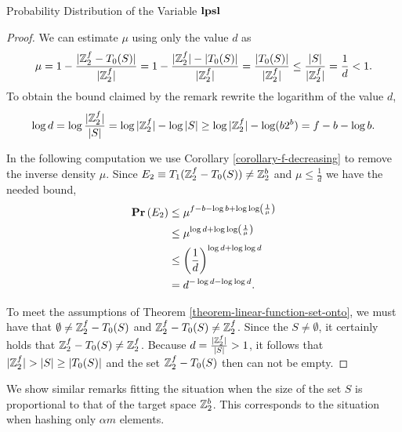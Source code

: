 \begin{section}{Probability Distribution of the Variable \texorpdfstring{$\mathbf{lpsl}$}{lpsl}}
\begin{proof}
We can estimate $\mu$ using only the value $d$ as
\[
	\mu = 1 - \frac{|\mathbb{Z}_{2}^{f} - T_0(S)|}{|\mathbb{Z}_{2}^{f}|} = 1 - \frac{|\mathbb{Z}_{2}^{f}| - |T_0(S)|}{|\mathbb{Z}_{2}^{f}|} = \frac{|T_0(S)|}{|\mathbb{Z}_{2}^{f}|} \leq \frac{|S|}{|\mathbb{Z}_{2}^{f}|} = \frac{1}{d} < 1 \text{.}
\]
To obtain the bound claimed by the remark rewrite the logarithm of the value $d$,
\[
	\log d = \log \frac{|\mathbb{Z}_{2}^{f}|}{|S|} = \log |\mathbb{Z}_{2}^{f}| - \log |S| \geq \log |\mathbb{Z}_{2}^{f}| - \log (b 2 ^ b) = f - b - \log b \text{.}
\]

In the following computation we use Corollary \ref{corollary-f-decreasing} to remove the inverse density $\mu$. Since $E_2 \equiv T_1(\mathbb{Z}_{2}^{f} - T_0(S)) \neq \mathbb{Z}_{2}^{b}$ and $\mu \leq \frac{1}{d}$ we have the needed bound,
\[
\begin{split}
\mathbf{Pr}\left(E_2\right)
	& \leq \mu^{f - b - \log b + \log \log \left(\frac{1}{\mu}\right)} \\
	& \leq \mu ^ {\log d + \log \log \left(\frac{1}{\mu}\right)} \\
	& \leq \left(\frac{1}{d}\right) ^ {\log d + \log \log d} \\
	& = d ^ {-\log d - \log \log d} \text{.} \\
\end{split}
\]

To meet the assumptions of Theorem \ref{theorem-linear-function-set-onto}, we must have that $\emptyset \neq \mathbb{Z}_{2}^{f} - T_0(S)$ and $\mathbb{Z}_{2}^{f} - T_0(S) \neq \mathbb{Z}_{2}^{f}$. Since the $S \neq \emptyset$, it certainly holds that $\mathbb{Z}_{2}^{f} - T_0(S) \neq \mathbb{Z}_{2}^{f}$. Because $d = \frac{|\mathbb{Z}_{2}^{f}|}{|S|} > 1$, it follows that $|\mathbb{Z}_{2}^{f}| > |S| \geq |T_0(S)|$ and the set $\mathbb{Z}_{2}^{f} - T_0(S)$ then can not be empty.
\end{proof}

We show similar remarks fitting the situation when the size of the set $S$ is proportional to that of the target space $\mathbb{Z}_{2}^{b}$. This corresponds to the situation when hashing only $\alpha m$ elements.


\end{section}
